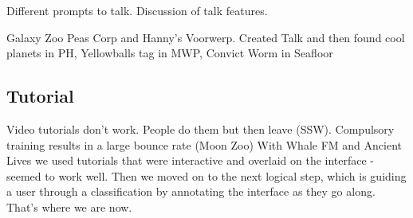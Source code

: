\documentclass{sigchi}
\begin{document}
Different prompts to talk.
Discussion of talk features. 

Galaxy Zoo Peas Corp and Hanny's Voorwerp.
Created Talk and then found cool planets in PH, Yellowballs tag in MWP, Convict Worm in Seafloor





\subsection{Tutorial}

Video tutorials don't work. People do them but then leave (SSW).
Compulsory training results in a large bounce rate (Moon Zoo)
With Whale FM and Ancient Lives we used tutorials that were interactive and overlaid on the interface - seemed to work well.
Then we moved on to the next logical step, which is guiding a user through a classification by annotating the interface as they go along. That's where we are now.

\end{document}
